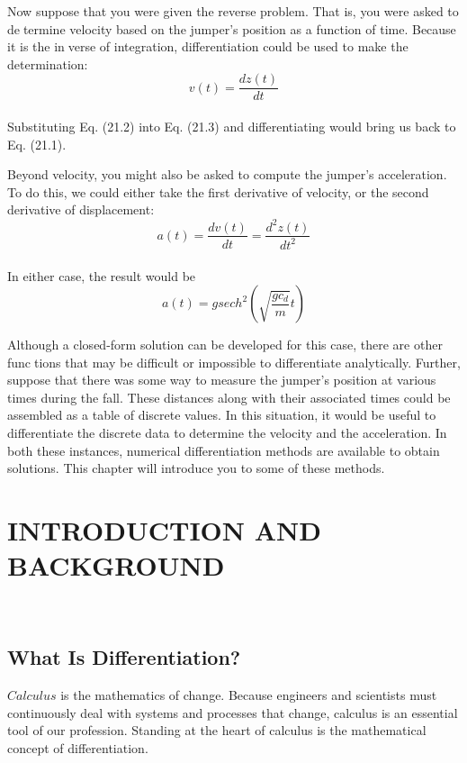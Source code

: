 Now suppose that you were given the reverse problem. That is, you were asked to determine velocity based on the jumper’s position as a function of time. Because it is the inverse of integration, differentiation could be used to make the determination:
\begin{equation}
	\tag{21.3}
	v(t) = \dfrac{dz(t)}{dt}
\end{equation}\\
Substituting Eq. (21.2) into Eq. (21.3) and differentiating would bring us back to Eq. (21.1).

Beyond velocity, you might also be asked to compute the jumper’s acceleration. To
do this, we could either take the first derivative of velocity, or the second derivative of
displacement:
\begin{equation}
	\tag{21.4}
	a(t) = \dfrac{dv(t)}{dt} = \dfrac{d^{2}z(t)}{dt^{2}}
\end{equation}\\
In either case, the result would be
\begin{equation}
	\tag{21.5}
	a(t) = g sech^{2} \left( \sqrt{\dfrac{gc_{d}}{m}}t \right)
\end{equation}

Although a closed-form solution can be developed for this case, there are other functions that may be difficult or impossible to differentiate analytically. Further, suppose that
there was some way to measure the jumper’s position at various times during the fall.
These distances along with their associated times could be assembled as a table of discrete
values. In this situation, it would be useful to differentiate the discrete data to determine the
velocity and the acceleration. In both these instances, numerical differentiation methods
are available to obtain solutions. This chapter will introduce you to some of these methods.

\vspace{0,6in}
\chapter{INTRODUCTION AND BACKGROUND}
\vspace{0,1in}
\hline\\
\vspace{0,1in}
\section{What Is Differentiation?}
$Calculus$ is the mathematics of change. Because engineers and scientists must continuously
deal with systems and processes that change, calculus is an essential tool of our profession.
Standing at the heart of calculus is the mathematical concept of differentiation.

